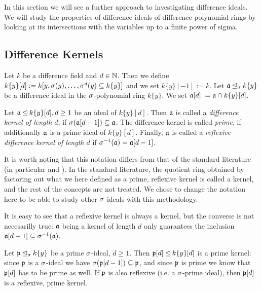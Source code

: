 In this section we will see a further approach to investigating difference ideals. We will study the properties of difference ideals of difference polynomial rings by looking at its intersections with the variables up to a finite power of sigma.

\subsection{Difference Kernels}


\begin{defn}
Let $k$ be a difference field and $d \in \mathbb{N}$. Then we define $k\{y\}[d]:= k[y,\sigma(y),\ldots,\sigma^d(y) \subseteq k\{y\}]$ and we set $k\{y\}[-1] := k$. Let $\mathfrak{a} \unlhd_{\sigma} k\{y\}$ be a difference ideal in the $\sigma$-polynomial ring $k\{y\}$. 
We set $\mathfrak{a}[d] := \mathfrak{a} \cap k\{y\}[d]$.
\end{defn}


\begin{defn}
Let $\mathfrak{a} \unlhd k\{y\}[d], d \geq 1$ be an ideal of $k\{y\}[d]$. Then $\mathfrak{a}$ is called a \emph{difference kernel of length $d$}, if $\sigma(\mathfrak{a}[d-1]) \subseteq \mathfrak{a}$. The difference kernel is called \emph{prime}, if additionally $\mathfrak{a}$ is a prime ideal of $k\{y\}[d]$.
Finally, $\mathfrak{a}$ is called a \emph{reflexive difference kernel of length $d$} if $\sigma^{-1}(\mathfrak{a}) = \mathfrak{a}[d-1]$.   
\end{defn}

It is worth noting that this notation differs from that of the standard literature (in particular \cite{cohn} and \cite{levin}). In the standard literature, the quotient ring obtained by factoring out 
what we here defined as a prime, reflexive kernel is called a kernel, and the rest of the concepts are not treated. We chose to change the notation here to be able to study other $\sigma$-ideals with this methodology.

\begin{rem}
It is easy to see that a reflexive kernel is always a kernel, but the converse is not necesarilly true: $\mathfrak{a}$ being a kernel of length $d$ only guarantees the inclusion $\mathfrak{a}[d-1] \subseteq \sigma^{-1}(\mathfrak{a})$.
\end{rem}

\begin{ex}
Let $\mathfrak{p} \unlhd_{\sigma} k\{y\}$ be a prime $\sigma$-ideal, $d \geq 1$. Then $\mathfrak{p}[d] \unlhd k\{y\}[d]$ is a prime kernel: since $\mathfrak{p}$ is a $\sigma$-ideal we have $\sigma(\mathfrak{p}[d-1]) \subseteq \mathfrak{p}$, 
and since $\mathfrak{p}$ is prime we know that $\mathfrak{p}[d]$ has to be prime as well. If $\mathfrak{p}$ is also reflexive (i.e. a $\sigma$-prime ideal), then $\mathfrak{p}[d]$ is a reflexive, prime kernel. 
\end{ex}


